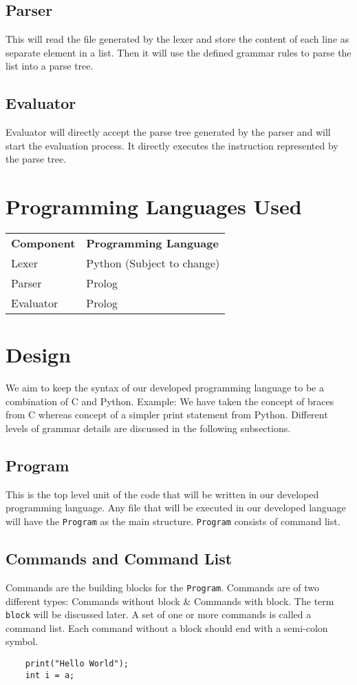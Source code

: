 \documentclass[12pt,letterpaper]{article}
\begin{document}
\subsection{Parser}
This will read the file generated by the lexer and store the content of each line as separate element in a list. Then it will use the defined grammar rules to parse the list into a parse tree.
\subsection{Evaluator}
Evaluator will directly accept the parse tree generated by the parser and will start the evaluation process. It directly executes the instruction represented by the parse tree.

\section{Programming Languages Used}
\begin{tabular}{ll}
    \textbf{Component} & \textbf{Programming Language} \\
    Lexer & Python (Subject to change) \\
    Parser & Prolog \\
    Evaluator & Prolog
\end{tabular}

\section{Design}
We aim to keep the syntax of our developed programming language to be a combination of C and Python. Example: We have taken the concept of braces from C whereas concept of a simpler print statement from Python. Different levels of grammar details are discussed in the following subsections.

\subsection{Program}
This is the top level unit of the code that will be written in our developed programming language. Any file that will be executed in our developed language will have the \texttt{Program} as the main structure.
\texttt{Program} consists of command list.

\subsection{Commands and Command List}
Commands are the building blocks for the \texttt{Program}. Commands are of two different types: Commands without block \& Commands with block. The term \texttt{block} will be discussed later. A set of one or more commands is called a command list. Each command without a block should end with a semi-colon symbol.
\begin{verbatim}
    print("Hello World");
    int i = a;
\end{verbatim}
\end{document}
